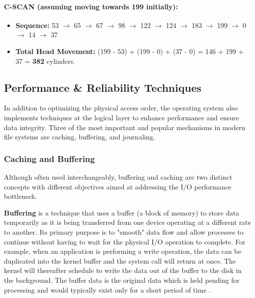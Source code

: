 \documentclass[12pt]{article}
\begin{document}
\paragraph{C-SCAN (assuming moving towards 199 initially):}
\begin{itemize}
    \item \textbf{Sequence:} 53 \(\rightarrow\) 65 \(\rightarrow\) 67 \(\rightarrow\) 98 \(\rightarrow\) 122 \(\rightarrow\) 124 \(\rightarrow\) 183 \(\rightarrow\) 199 \(\rightarrow\) 0 \(\rightarrow\) 14 \(\rightarrow\) 37
    \item \textbf{Total Head Movement:} (199 - 53) + (199 - 0) + (37 - 0) = 146 + 199 + 37 = \textbf{382} cylinders.
\end{itemize}




\subsection{Performance \& Reliability Techniques}
In addition to optimizing the physical access order, the operating system also implements techniques at the logical layer to enhance performance and ensure data integrity. Three of the most important and popular mechanisms in modern file systems are caching, buffering, and journaling.

\subsubsection{Caching and Buffering}
Although often used interchangeably, buffering and caching are two distinct concepts with different objectives aimed at addressing the I/O performance bottleneck.

\textbf{Buffering} is a technique that uses a buffer (a block of memory) to store data temporarily as it is being transferred from one device operating at a different rate to another. Its primary purpose is to "smooth" data flow and allow processes to continue without having to wait for the physical I/O operation to complete. For example, when an application is performing a write operation, the data can be duplicated into the kernel buffer and the system call will return at once. The kernel will thereafter schedule to write the data out of the buffer to the disk in the background. The buffer data is the original data which is held pending for processing and would typically exist only for a short period of time \parencite{GeeksForGeeks2025BufferCache}.
\end{document}
